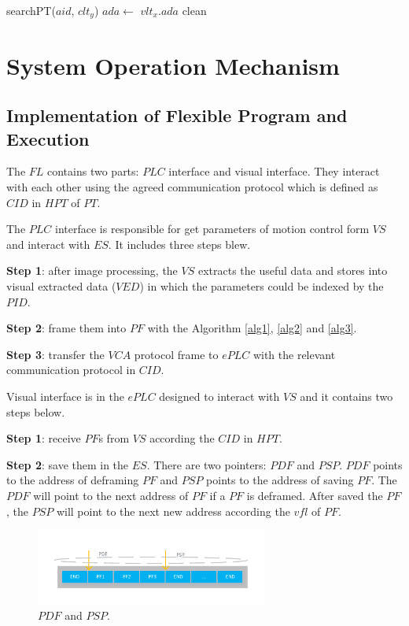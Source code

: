 \documentclass[journal,UTF8]{IEEEtran}
\begin{document}
\begin{algorithm}
	\label{alg6}
	\caption{$ALDeframing$}%
	searchPT($aid$, $clt_y$)\;
	$ada\leftarrow$ $vlt_x.ada$\;
	clean\;
\end{algorithm}


\section{System Operation Mechanism}
\label{Execution}
\subsection{Implementation of Flexible Program and Execution}
The $FL$ contains two parts: $PLC$ interface and visual interface. They interact with each other using the agreed communication protocol which is defined as $CID$ in $HPT$ of $PT$.

The $PLC$ interface is responsible for get parameters of motion control form $VS$ and interact with $ES$. It includes three steps blew.

\textbf{Step 1}: after image processing, the $VS$ extracts the useful data and stores into visual extracted data ($VED$) in which the parameters could be indexed by the $PID$.

\textbf{Step 2}: frame them into $PF$ with the Algorithm \ref{alg1}, \ref{alg2} and \ref{alg3}.

\textbf{Step 3}: transfer the $VCA$ protocol frame to $ePLC$ with the relevant communication protocol in $CID$.

Visual interface is in the $ePLC$ designed to interact with $VS$ and it contains two steps below. 

\textbf{Step 1}: receive $PF$s from $VS$ according the $CID$ in $HPT$.

\textbf{Step 2}: save them in the $ES$. There are two pointers: $PDF$ and $PSP$. $PDF$ points to the address of deframing $PF$ and $PSP$ points to the address of saving $PF$. The $PDF$ will point to the next address of $PF$ if a $PF$ is deframed. After saved the $PF$, the $PSP$ will point to the next new address according the $vfl$ of $PF$. 

  

\begin{figure}
	\centering
	\includegraphics[width=3in]{fig/VisualInterface.pdf}
	\caption{ $PDF$ and $PSP$.}
	\label{fig:VisualInterface}
\end{figure}
\end{document}
